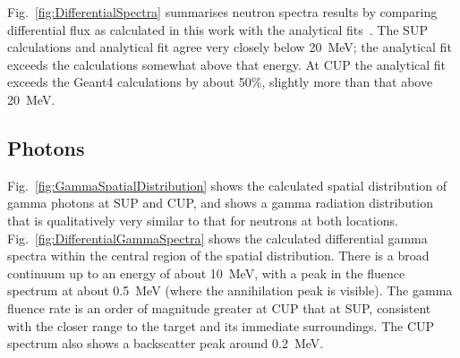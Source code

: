 \documentclass[peerreviewca,11pt,a4paper]{IEEEtran}
\begin{document}
Fig.~\ref{fig:DifferentialSpectra} summarises neutron spectra results by comparing differential flux as calculated in this work with the analytical fits~\cite{Prokofiev2009,Prokofiev2014}.
The SUP calculations and analytical fit agree very closely below \SI{20}{\MeV}; the analytical fit exceeds the calculations somewhat above that energy.
At CUP the analytical fit exceeds the Geant4 calculations by about 50\%, slightly more than that above \SI{20}{\MeV}.

\subsection{Photons}
Fig.~\ref{fig:GammaSpatialDistribution} shows the calculated spatial distribution of gamma photons at SUP and CUP, and shows a gamma radiation distribution that is qualitatively very similar to that for neutrons at both locations.
Fig.~\ref{fig:DifferentialGammaSpectra} shows the calculated differential gamma spectra within the central region of the spatial distribution.
There is a broad continuum up to an energy of about \SI{10}{\MeV}, with a peak in the fluence spectrum at about \SI{0.5}{\MeV} (where the annihilation peak is visible).
The gamma fluence rate is an order of magnitude greater at CUP that at SUP, consistent with the closer range to the target and its immediate surroundings.
The CUP spectrum also shows a backscatter peak around \SI{0.2}{\MeV}.
\end{document}
